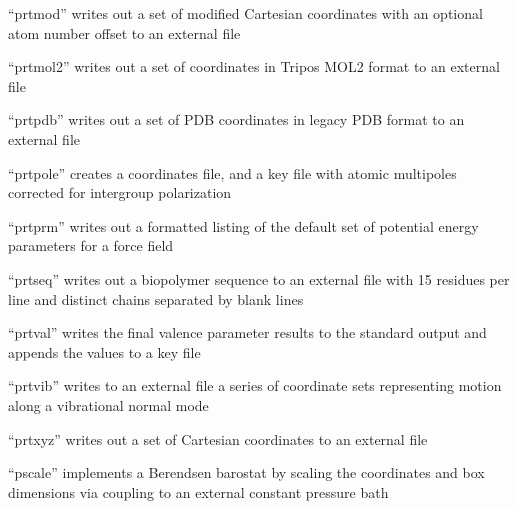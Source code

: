 \documentclass[letterpaper,11pt,english]{sphinxmanual}
\begin{document}
\sphinxAtStartPar
“prtmod” writes out a set of modified Cartesian coordinates with an optional atom number offset to an external file

\sphinxAtStartPar
{}

\sphinxAtStartPar
“prtmol2” writes out a set of coordinates in Tripos MOL2 format to an external file

\sphinxAtStartPar
{}

\sphinxAtStartPar
“prtpdb” writes out a set of PDB coordinates in legacy PDB format to an external file

\sphinxAtStartPar
{}

\sphinxAtStartPar
“prtpole” creates a coordinates file, and a key file with atomic multipoles corrected for intergroup polarization

\sphinxAtStartPar
{}

\sphinxAtStartPar
“prtprm” writes out a formatted listing of the default set of potential energy parameters for a force field

\sphinxAtStartPar
{}

\sphinxAtStartPar
“prtseq” writes out a biopolymer sequence to an external file with 15 residues per line and distinct chains separated by blank lines

\sphinxAtStartPar
{}

\sphinxAtStartPar
“prtval” writes the final valence parameter results to the standard output and appends the values to a key file

\sphinxAtStartPar
{}

\sphinxAtStartPar
“prtvib” writes to an external file a series of coordinate sets representing motion along a vibrational normal mode

\sphinxAtStartPar
{}

\sphinxAtStartPar
“prtxyz” writes out a set of Cartesian coordinates to an external file

\sphinxAtStartPar
{}

\sphinxAtStartPar
“pscale” implements a Berendsen barostat by scaling the coordinates and box dimensions via coupling to an external constant pressure bath

\sphinxAtStartPar
{}
\end{document}
